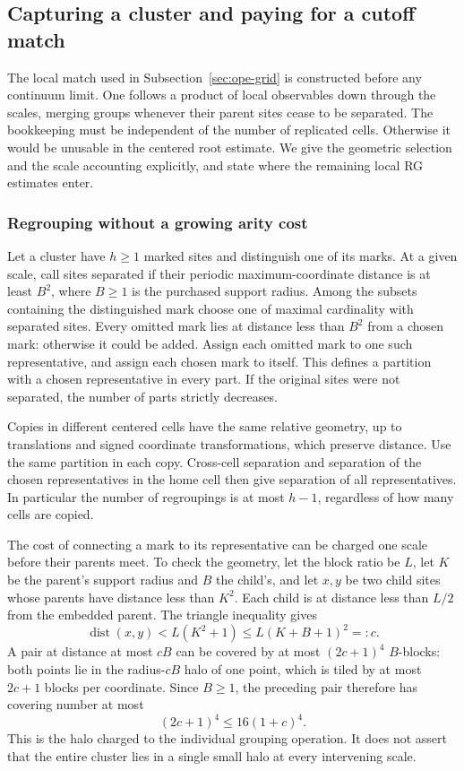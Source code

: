 \subsection{Capturing a cluster and paying for a cutoff match}
\label{sec:ope-cutoff}
The local match used in Subsection~\ref{sec:ope-grid} is constructed before
any continuum limit. One follows a product of local observables down
through the scales, merging groups whenever their parent sites cease
to be separated. The bookkeeping must be independent of the number of
replicated cells. Otherwise it would be unusable in the centered root
estimate. We give the geometric selection and the scale accounting
explicitly, and state where the remaining local RG estimates enter.

\subsubsection{Regrouping without a growing arity cost}
Let a cluster have $h\geq1$ marked sites and distinguish one of its
marks. At a given scale, call sites separated if their periodic
maximum-coordinate distance is at least $B^2$, where $B\geq1$ is the
purchased support radius. Among the subsets containing the distinguished
mark choose one of maximal cardinality with separated sites. Every
omitted mark lies at distance less than $B^2$ from a chosen mark:
otherwise it could be added. Assign each omitted mark to one such
representative, and assign each chosen mark to itself. This defines a
partition with a chosen representative in every part. If the original
sites were not separated, the number of parts strictly decreases.

Copies in different centered cells have the same relative geometry,
up to translations and signed coordinate transformations, which preserve
distance. Use the same partition in each copy. Cross-cell separation
and separation of the chosen representatives in the home cell then
give separation of all representatives. In particular the number of
regroupings is at most $h-1$, regardless of how many cells are copied.

The cost of connecting a mark to its representative can be charged
one scale before their parents meet. To check the geometry, let the
block ratio be $L$, let $K$ be the parent's support radius and $B$ the
child's, and let $x,y$ be two child sites whose parents have distance
less than $K^2$. Each child is at distance less than $L/2$ from the
embedded parent. The triangle inequality gives
\[
 \operatorname{dist}(x,y)<L(K^2+1)\leq L(K+B+1)^2=:c.
\]
A pair at distance at most $cB$ can be covered by at most $(2c+1)^4$
$B$-blocks: both points lie in the radius-$cB$ halo of one point,
which is tiled by at most $2c+1$ blocks per coordinate. Since $B\geq1$,
the preceding pair therefore has covering number at most
\begin{equation}\label{eq:ope-pair-halo}
 (2c+1)^4\leq16(1+c)^4.
\end{equation}
This is the halo charged to the individual grouping operation. It
does not assert that the entire cluster lies in a single small halo
at every intervening scale.

